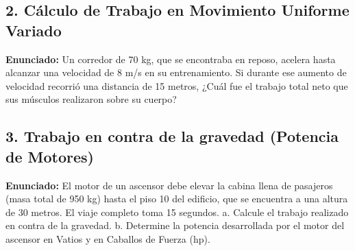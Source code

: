 \documentclass[12pt, letterpaper]{article}
\begin{document}
	
	\subsection*{2. Cálculo de Trabajo en Movimiento Uniforme Variado}
	\noindent \textbf{Enunciado:} Un corredor de 70 kg, que se encontraba en reposo, acelera hasta alcanzar una velocidad de 8 m/s en su entrenamiento. Si durante ese aumento de velocidad recorrió una distancia de 15 metros, ¿Cuál fue el trabajo total neto que sus músculos realizaron sobre su cuerpo?
	
	
	\subsection*{3. Trabajo en contra de la gravedad (Potencia de Motores)}
	\noindent \textbf{Enunciado:} El motor de un ascensor debe elevar la cabina llena de pasajeros (masa total de 950 kg) hasta el piso 10 del edificio, que se encuentra a una altura de 30 metros. El viaje completo toma 15 segundos. a. Calcule el trabajo realizado en contra de la gravedad. b. Determine la potencia desarrollada por el motor del ascensor en Vatios y en Caballos de Fuerza (hp).
	
\end{document}
